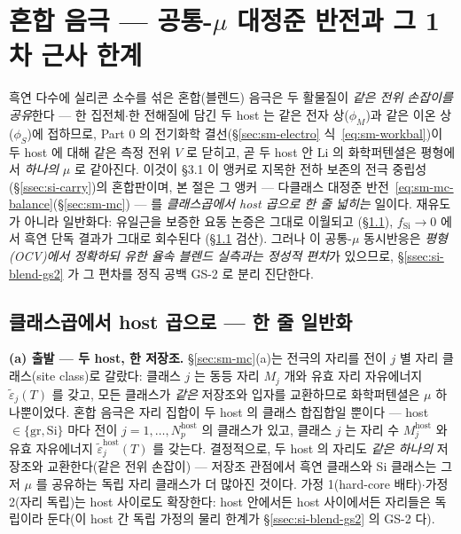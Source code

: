 \section{혼합 음극 --- 공통-$\mu$ 대정준 반전과 그 1차 근사 한계}\label{sec:si-blend}
흑연 다수에 실리콘 소수를 섞은 혼합(블렌드) 음극은 두 활물질이 \emph{같은 전위 손잡이를 공유}한다 ---
한 집전체$\cdot$한 전해질에 담긴 두 host 는 같은 전자 상($\phi_M$)과 같은 이온 상($\phi_S$)에 접하므로,
Part 0 의 전기화학 결선(\S\ref{sec:sm-electro} 식~\eqref{eq:sm-workbal})이 두 host 에 대해 같은 측정
전위 $V$ 로 닫히고, 곧 두 host 안 Li 의 화학퍼텐셜은 평형에서 \emph{하나의} $\mu$ 로 같아진다. 이것이
§3.1 이 앵커로 지목한 전하 보존의 전극 중립성(\S\ref{ssec:si-carry})의 혼합판이며, 본 절은 그
앵커 --- 다클래스 대정준 반전~\eqref{eq:sm-mc-balance}(\S\ref{sec:sm-mc}) --- 를 \emph{클래스곱에서
host 곱으로 한 줄 넓히는} 일이다. 재유도가 아니라 일반화다: 유일근을 보증한 요동 논증은 그대로 이월되고
(\S\ref{ssec:si-blend-derive}), $f_\mathrm{Si}\to0$ 에서 흑연 단독 결과가 그대로 회수된다
(\S\ref{ssec:si-blend-derive} 검산). 그러나 이 공통-$\mu$ 동시반응은 \emph{평형(OCV)에서 정확하되 유한
율속 블렌드 실측과는 정성적 편차}가 있으므로, \S\ref{ssec:si-blend-gs2} 가 그 편차를 정직 공백 GS-2 로
분리 진단한다.

\subsection{클래스곱에서 host 곱으로 --- 한 줄 일반화}\label{ssec:si-blend-derive}
\textbf{(a) 출발 --- 두 host, 한 저장조.} \S\ref{sec:sm-mc}(a)는 전극의 자리를 전이 $j$ 별 자리
클래스(site class)로 갈랐다: 클래스 $j$ 는 동등 자리 $M_j$ 개와 유효 자리 자유에너지
$\tilde\varepsilon_j(T)$ 를 갖고, 모든 클래스가 \emph{같은} 저장조와 입자를 교환하므로 화학퍼텐셜은
$\mu$ 하나뿐이었다. 혼합 음극은 자리 집합이 두 host 의 클래스 합집합일 뿐이다 --- host $\in\{\mathrm{gr},
\mathrm{Si}\}$ 마다 전이 $j=1,\dots,N_p^\mathrm{host}$ 의 클래스가 있고, 클래스 $j$ 는 자리 수
$M_j^\mathrm{host}$ 와 유효 자유에너지 $\tilde\varepsilon_j^\mathrm{host}(T)$ 를 갖는다. 결정적으로, 두
host 의 자리도 \emph{같은 하나의} 저장조와 교환한다(같은 전위 손잡이) --- 저장조 관점에서 흑연 클래스와
Si 클래스는 그저 $\mu$ 를 공유하는 독립 자리 클래스가 더 많아진 것이다. 가정 1(hard-core 배타)$\cdot$가정
2(자리 독립)는 host 사이로도 확장한다: host 안에서든 host 사이에서든 자리들은 독립이라 둔다(이 host 간
독립 가정의 물리 한계가 \S\ref{ssec:si-blend-gs2} 의 GS-2 다).

